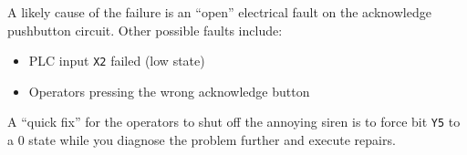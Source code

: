 





A likely cause of the failure is an ``open'' electrical fault on the acknowledge pushbutton circuit.  Other possible faults include:

\begin{itemize}
\item{} PLC input {\tt X2} failed (low state)
\item{} Operators pressing the wrong acknowledge button
\end{itemize}

\vskip 10pt

A ``quick fix'' for the operators to shut off the annoying siren is to force bit {\tt Y5} to a 0 state while you diagnose the problem further and execute repairs.











